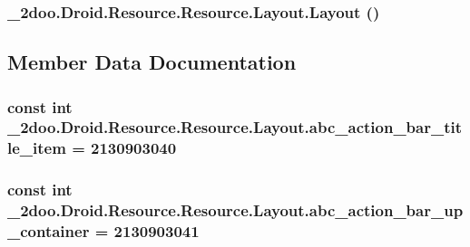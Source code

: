 \hypertarget{class__2doo_1_1_droid_1_1_resource_1_1_layout_336828bd1d1888bd39689e9f341fa4f6}{
\subsubsection[{Layout}]{\setlength{\rightskip}{0pt plus 5cm}\_\-2doo.Droid.Resource.Resource.Layout.Layout ()}}
\label{class__2doo_1_1_droid_1_1_resource_1_1_layout_336828bd1d1888bd39689e9f341fa4f6}




\subsection{Member Data Documentation}
\hypertarget{class__2doo_1_1_droid_1_1_resource_1_1_layout_d4d0e24ee5e0e534a01020ef4ede81f9}{
\subsubsection[{abc\_\-action\_\-bar\_\-title\_\-item}]{\setlength{\rightskip}{0pt plus 5cm}const int \_\-2doo.Droid.Resource.Resource.Layout.abc\_\-action\_\-bar\_\-title\_\-item = 2130903040}}
\label{class__2doo_1_1_droid_1_1_resource_1_1_layout_d4d0e24ee5e0e534a01020ef4ede81f9}


\hypertarget{class__2doo_1_1_droid_1_1_resource_1_1_layout_6221835d62f368db46695d8b7486fd3e}{
\subsubsection[{abc\_\-action\_\-bar\_\-up\_\-container}]{\setlength{\rightskip}{0pt plus 5cm}const int \_\-2doo.Droid.Resource.Resource.Layout.abc\_\-action\_\-bar\_\-up\_\-container = 2130903041}}
\label{class__2doo_1_1_droid_1_1_resource_1_1_layout_6221835d62f368db46695d8b7486fd3e}


